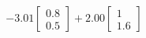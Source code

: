 \documentclass[preview]{standalone}
\begin{document}
\begin{align*}
-3.01 \begin{bmatrix} 0.8 \\ 0.5 \end{bmatrix} + 2.00 \begin{bmatrix} 1 \\ 1.6 \end{bmatrix}
\end{align*}
\end{document}
